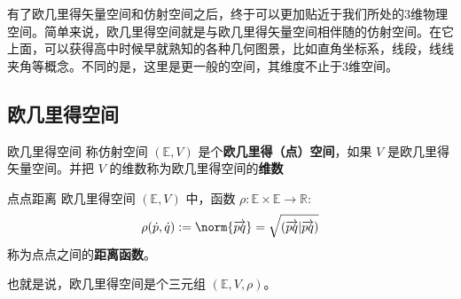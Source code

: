 
\begin{issues}
\issueDraft
\end{issues}

有了欧几里得矢量空间和仿射空间之后，终于可以更加贴近于我们所处的3维物理空间。简单来说，欧几里得空间就是与欧几里得矢量空间相伴随的仿射空间。在它上面，可以获得高中时候早就熟知的各种几何图景，比如直角坐标系，线段，线线夹角等概念。不同的是，这里是更一般的空间，其维度不止于3维空间。
\subsection{欧几里得空间}
\begin{definition}{欧几里得空间}
称仿射空间 $(\mathbb E,V)$ 是个\textbf{欧几里得（点）空间}，如果 $V$ 是欧几里得矢量空间。并把 $V$ 的维数称为欧几里得空间的\textbf{维数}
\end{definition}
\begin{definition}{点点距离}
欧几里得空间 $(\mathbb E,V)$ 中，函数 $\rho:\mathbb E\times\mathbb E\rightarrow\mathbb R$:
\begin{equation}
\rho(\dot p,\dot q):=\norm{\overrightarrow{pq}}=\sqrt{(\overrightarrow{pq}|\overrightarrow{pq})}
\end{equation}
称为点点之间的\textbf{距离函数}。
\end{definition}
也就是说，欧几里得空间是个三元组 $(\mathbb E,V,\rho)$。

